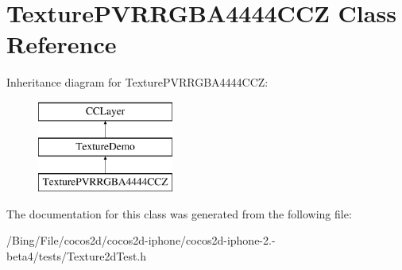 \hypertarget{interface_texture_p_v_r_r_g_b_a4444_c_c_z}{\section{Texture\-P\-V\-R\-R\-G\-B\-A4444\-C\-C\-Z Class Reference}
\label{interface_texture_p_v_r_r_g_b_a4444_c_c_z}
}
Inheritance diagram for Texture\-P\-V\-R\-R\-G\-B\-A4444\-C\-C\-Z\-:\begin{figure}[H]
\begin{center}
\leavevmode
\includegraphics[height=3.000000cm]{interface_texture_p_v_r_r_g_b_a4444_c_c_z}
\end{center}
\end{figure}


The documentation for this class was generated from the following file\-:\begin{DoxyCompactItemize}
\item 
/\-Bing/\-File/cocos2d/cocos2d-\/iphone/cocos2d-\/iphone-\/2.-\/beta4/tests/Texture2d\-Test.\-h\end{DoxyCompactItemize}
